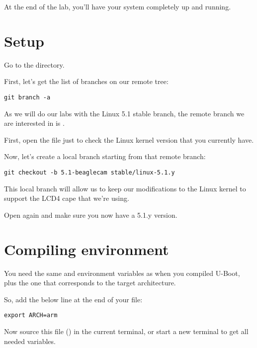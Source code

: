 
At the end of the lab, you'll have your system completely up and
running.

\section{Setup}

Go to the  directory.

First, let's get the list of branches on our  remote tree:

\begin{verbatim}
git branch -a
\end{verbatim}

As we will do our labs with the Linux 5.1 stable branch, the remote branch
we are interested in is .

First, open the  file just to check the Linux kernel
version that you currently have.

Now, let's create a local branch starting from that remote branch:
\begin{verbatim}
git checkout -b 5.1-beaglecam stable/linux-5.1.y
\end{verbatim}

This local branch will allow us to keep our modifications to the Linux
kernel to support the LCD4 cape that we're using.

Open  again and make sure you now have a 5.1.y version.

\section{Compiling environment}

You need the same  and  environment
variables as when you compiled U-Boot, plus the  one that
corresponds to the target architecture.

So, add the below line at the end of your  file:

\begin{verbatim}
export ARCH=arm
\end{verbatim}

Now source this file ()  in the current terminal,
or start a new terminal to get all needed variables.

